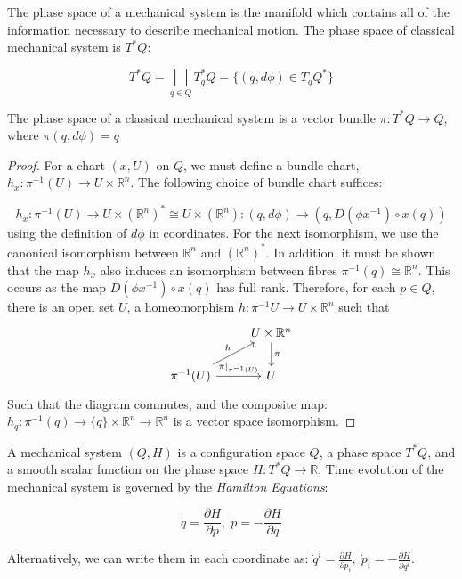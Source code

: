 \begin{defn}
The phase space of a mechanical system is the manifold which contains all of the information necessary to describe mechanical motion. The phase space of classical mechanical system is $T^{*} Q$:

$$T^{*} Q = \bigsqcup_{q \in Q} T^{*}_{q} Q = \{(q, d \phi) \in T_{q} Q^{*} \}$$ 
\end{defn}

\begin{lemma}
\label{CotangentBundle}
The phase space of a classical mechanical system is a vector bundle $\pi: T^{*} Q \to Q$, where $\pi (q, d \phi) = q$
\end{lemma}

\begin{proof}
For a chart $(x, U)$ on $Q$, we must define a bundle chart, $h_{x}: \pi^{-1}(U) \to U \times \mathbb{R}^{n}$. The following choice of bundle chart suffices:

$$h_{x}: \pi^{-1}(U) \to U \times (\mathbb{R}^{n})^{*} \cong U \times (\mathbb{R}^{n}): (q, d \phi) \to (q, D(\phi x^{-1}) \circ x(q))$$ 
using the definition of $d \phi$ in coordinates. For the next isomorphism, we use the canonical isomorphism between $\mathbb{R}^{n}$ and $(\mathbb{R}^{n})^{*}$. In addition, it must be shown that the map $h_{x}$ also induces an isomorphism between fibres $\pi^{-1}(q) \cong \mathbb{R}^{n}$. This occurs as the map $D(\phi x^{-1}) \circ x(q)$ has full rank. Therefore, for each $p \in Q$, there is an open set $U$, a homeomorphism $h: \pi^{-1} U \to U \times \mathbb{R}^{n}$ such that
\[
\begin{tikzcd}
& U \times \mathbb{R}^{n} \arrow[d, "\pi"] \\
\pi^{-1}(U) \arrow[ru, "h"] \arrow[r, "\pi|_{\pi^{-1}(U)}"] & U
\end{tikzcd}
\]
\noindent Such that the diagram commutes, and the composite map: $h_{q}: \pi^{-1}(q) \to \{q\} \times \mathbb{R}^{n} \to \mathbb{R}^{n}$ is a vector space isomorphism. 
\end{proof}

\begin{defn}
A mechanical system $(Q, H)$ is a configuration space $Q$, a phase space $T^{*} Q$, and a smooth scalar function on the phase space $H: T^{*} Q \to \mathbb{R}$. Time evolution of the mechanical system is governed by the \textit{Hamilton Equations}:

$$\dot{q} = \frac{\partial H}{\partial p}, \; \dot{p} = -\frac{\partial H}{\partial q}$$

\noindent Alternatively, we can write them in each coordinate as: $\dot{q}^{i} = \frac{\partial H}{\partial p_{i}}, \; \dot{p}_{i} = -\frac{\partial H}{\partial q^{i}}$.

\end{defn}

